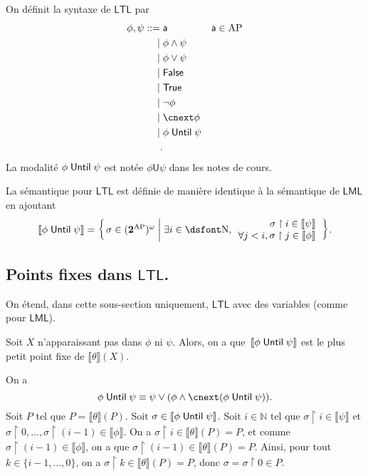 \documentclass[./main]{subfiles}
\begin{document}
  \begin{defn}
    On définit la syntaxe de $\mathsf{LTL}$ par 
    \begin{align*}
      \phi, \psi ::= {} & \mathsf{a} & \mathsf{a} \in \mathrm{AP}\\
      \mid{} & \phi \land \psi  \\
      \mid{} & \phi \lor \psi  \\
      \mid{} & \mathsf{False} \\
      \mid{} & \mathsf{True} \\
      \mid{} & \lnot \phi \\
      \mid{} & \nxt \phi \\
      \mid{} & \phi \until \psi \\
    .\end{align*}
    La modalité $\phi \mathrel{\mathsf{Until}} \psi$ est notée $\phi \mathrel{\mathsf{U}} \psi$ dans les notes de cours.

    La sémantique pour $\mathsf{LTL}$ est définie de manière identique à la sémantique de $\mathsf{LML}$ en ajoutant 
    \[
    \textstyle \llbracket \phi \until \psi \rrbracket  
    = \mleft\{\,\sigma \in (\mathbf{2}^\mathrm{AP})^\omega \;\middle|\; \exists i \in \mathds{N}, 
    \begin{array}{r}
      \sigma \upharpoonright i \in \llbracket \psi\rrbracket \\
      \forall j < i, \sigma \upharpoonright j \in \llbracket \phi\rrbracket  
    \end{array}\,\mright\} 
    .\] 
  \end{defn}

  \subsection{Points fixes dans $\mathsf{LTL}$.}

  On étend, dans cette sous-section uniquement, $\mathsf{LTL}$ avec des variables (comme pour $\mathsf{LML}$).

  \begin{lem}
    Soit $X$ n'apparaissant pas dans $\phi$ ni $\psi$.
    Alors, on a que~$\llbracket \phi \mathrel{\mathsf{Until}} \psi \rrbracket$ est le plus petit point fixe de $\llbracket \theta\rrbracket(X)$.
  \end{lem}
  \begin{prv}
    On a 
    \[
    \phi \until \psi \equiv \psi \lor (\phi \land \nxt (\phi \until \psi))
    .\] 
    Soit $P$ tel que $P = \llbracket \theta\rrbracket(P)$.
    Soit $\sigma \in \llbracket \phi \mathrel{\mathsf{Until}} \psi\rrbracket$.
    Soit $i \in \mathds{N}$ tel que $\sigma \upharpoonright i \in \llbracket \psi\rrbracket$ et $\sigma \upharpoonright 0, \ldots, \sigma \upharpoonright (i - 1) \in \llbracket \phi\rrbracket$.
    On a $\sigma \upharpoonright i \in \llbracket \theta\rrbracket(P) = P$, et comme $\sigma \upharpoonright (i-1) \in \llbracket \phi\rrbracket $, on a que $\sigma \upharpoonright (i-1) \in \llbracket \theta \rrbracket (P) = P $.
    Ainsi, pour tout $k \in \{i-1, \ldots, 0\}$, on a $\sigma \upharpoonright k \in \llbracket \theta\rrbracket (P) = P $, donc $\sigma = \sigma \upharpoonright 0 \in P$.
  \end{prv}
\end{document}

